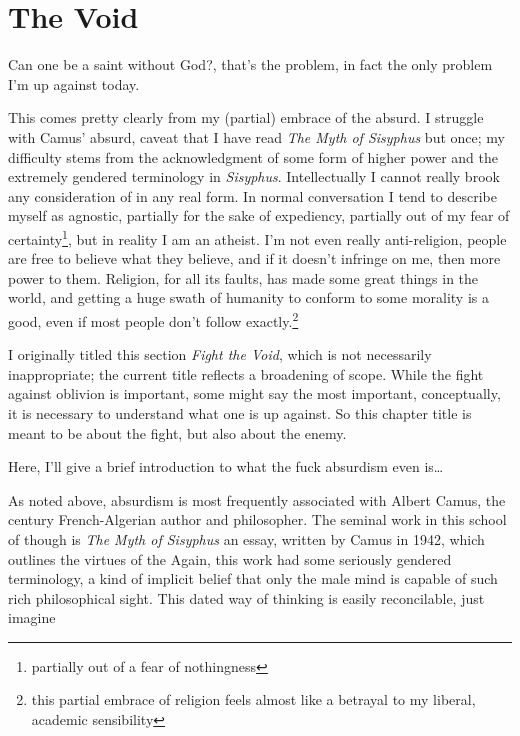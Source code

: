 \documentclass[../butidigress.tex]{subfiles}
\begin{document}
\chapter{The Void}\label{chap:thevoid}
\epigraph{Can one be a saint without God?, that's the problem, in fact the only problem I'm up against today.}{}
\newpage
This comes pretty clearly from my (partial) embrace of the absurd.
I struggle with Camus' absurd, caveat that I have read \textit{The Myth of Sisyphus} but once; my difficulty stems from the acknowledgment of some form of higher power and the extremely gendered terminology in \textit{Sisyphus}.
Intellectually I cannot really brook any consideration of  in any real form.
In normal conversation I tend to describe myself as agnostic, partially for the sake of expediency, partially out of my fear of certainty\footnote{partially out of a fear of nothingness}, but in reality I am an atheist.
I'm not even really anti-religion, people are free to believe what they believe, and if it doesn't infringe on me, then more power to them.
Religion, for all its faults, has made some great things in the world, and getting a huge swath of humanity to conform to some morality is a good, even if most people don't follow exactly.\footnote{this partial embrace of religion feels almost like a betrayal to my liberal, academic sensibility}

I originally titled this section \textit{Fight the Void}, which is not necessarily inappropriate; the current title reflects a broadening of scope.
While the fight against oblivion is important, some might say the most important, conceptually, it is necessary to understand what one is up against.
So this chapter title is meant to be about the fight, but also about the enemy.

\entryskip

Here, I'll give a brief introduction to what the fuck absurdism even is\ldots

As noted above, absurdism is most frequently associated with Albert Camus, the  century French-Algerian author and philosopher.
The seminal work in this school of though is \textit{The Myth of Sisyphus} an essay, written by Camus in 1942, which outlines the virtues of the 
Again, this work had some seriously gendered terminology, a kind of implicit belief that only the male mind is capable of such rich philosophical sight.
This dated way of thinking is easily reconcilable, just imagine 
\end{document}
